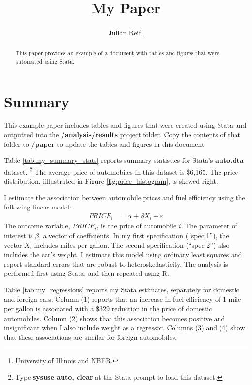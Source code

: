 \documentclass[12pt]{article}
\begin{document}
\title{My Paper}
\author{Julian Reif\thanks{University of Illinois and NBER.}}
\maketitle

\begin{abstract}
\noindent 
This paper provides an example of a document with tables and figures that were automated using Stata.
\end{abstract}

\clearpage

\section{Summary}

This example paper includes tables and figures that were created using Stata and outputted into the \textbf{/analysis/results} project folder. Copy the contents of that folder to \textbf{/paper} to update the tables and figures in this document.

Table \ref{tab:my_summary_stats} reports summary statistics for Stata's \textbf{auto.dta} dataset.%
%
\footnote{Type \textbf{sysuse auto, clear} at the Stata prompt to load this dataset.}
%
The average price of automobiles in this dataset is \$6,165. The price distribution, iillustrated in Figure \ref{fig:price_histogram}, is skewed right.

I estimate the association between automobile prices and fuel efficiency using the following linear model:
\begin{align}
PRICE_i&=\alpha + \beta X_i + \varepsilon \label{eqn:model} 
\end{align}
The outcome variable, $PRICE_i$, is the price of automobile $i$. The parameter of interest is $\beta$, a vector of coefficients. In my first specification (``spec 1''), the vector $X_i$ includes miles per gallon. The second specification (``spec 2'') also includes the car's weight. I estimate this model using ordinary least squares and report standard errors that are robust to heteroskedasticity. The analysis is performed first using Stata, and then repeated using R.

Table \ref{tab:my_regressions} reports my Stata estimates, separately for domestic and foreign cars. Column (1) reports that an increase in fuel efficiency of 1 mile per gallon is associated with a \$329 reduction in the price of domestic automobiles. Column (2) shows that this association becomes positive and insignificant when I also include weight as a regressor. Columns (3) and (4) show that these associations are similar for foreign automobiles. 
\end{document}
